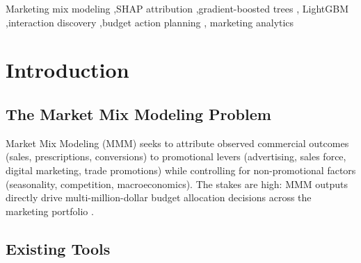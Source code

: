 \documentclass[review,12pt]{elsarticle}
\begin{document}
\begin{frontmatter}
\begin{abstract}
Beyond attribution, TreeMMM's mROI simulator recovers channel ranking and
direction reliably (Spearman $\rho = 0.96$, 94\% direction accuracy), then
uses the same response surface to show where committed incremental budget
would land. On the pharma DGP, a committed +25\% rep-visit increase under a
95th-percentile per-HCP cap spreads the increment across HCP-period cells,
predicting +27.8\% lift against a +20.7\% DGP-reference response. Absolute
lift magnitude remains a synthetic model counterfactual and should be
calibrated against lift studies, geo-experiments, or in-market tests before
use as a forecast.

All results are from synthetic benchmarks. Source code and demonstration
scripts are available under the MIT license in the Python and R GitHub
repositories cited in Code availability.
\end{abstract}

\begin{keyword}
Marketing mix modeling \sep SHAP attribution \sep gradient-boosted trees \sep
LightGBM \sep interaction discovery \sep budget action planning \sep
marketing analytics
\end{keyword}

\end{frontmatter}

\section{Introduction}
\label{sec:intro}

\subsection{The Market Mix Modeling Problem}
\label{sec:intro:problem}

Market Mix Modeling (MMM) seeks to attribute observed commercial outcomes
(sales, prescriptions, conversions) to promotional levers (advertising, sales
force, digital marketing, trade promotions) while controlling for
non-promotional factors (seasonality, competition, macroeconomics). The stakes
are high: MMM outputs directly drive multi-million-dollar budget allocation
decisions across the marketing portfolio \cite{little1979aggregate}.

\subsection{Existing Tools}
\label{sec:intro:tools}
\end{document}
